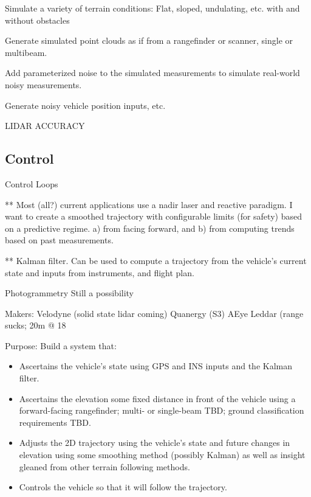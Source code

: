 \documentclass[10pt,a4paper]{report}
\begin{document}
Simulate a variety of terrain conditions: Flat, sloped, undulating, etc. with and without obstacles

Generate simulated point clouds as if from a rangefinder or scanner, single or multibeam.

Add parameterized noise to the simulated measurements to simulate real-world noisy measurements.

Generate noisy vehicle position inputs, etc.

LIDAR ACCURACY \cite{May2007}




\subsection{Control}

Control Loops








** Most (all?) current applications use a nadir laser and reactive paradigm. I want to create a smoothed trajectory with configurable limits (for safety) based on a predictive regime. a) from facing forward, and b) from computing trends based on past measurements.

** Kalman filter. Can be used to compute a trajectory from the vehicle’s current state and inputs from instruments, and flight plan. 



Photogrammetry
Still a possibility

Makers:
Velodyne (solid state lidar coming)
Quanergy (S3)
AEye
Leddar (range sucks; 20m @ 18%

Purpose: Build a system that:

\begin{itemize}
\item Ascertains the vehicle's state using GPS and INS inputs and the Kalman filter.
\item Ascertains the elevation some fixed distance in front of the vehicle using a forward-facing rangefinder; multi- or single-beam TBD; ground classification requirements TBD.
\item Adjusts the 2D trajectory using the vehicle's state and future changes in elevation using some smoothing method (possibly Kalman) as well as insight gleaned from other terrain following methods.
\item Controls the vehicle so that it will follow the trajectory.
\end{itemize}




\end{document}

